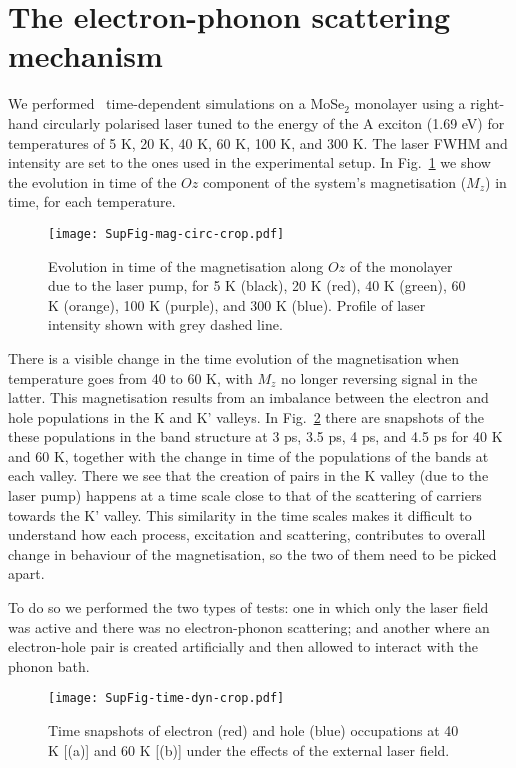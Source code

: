 \documentclass[prb,aps,superscriptaddress,reprint,floatfix]{revtex4-1}
\begin{document}
\section{The electron-phonon scattering mechanism}
\label{laser_elph}
We performed \ai  ~time-dependent simulations on a MoSe$_2$ monolayer using a right-hand circularly polarised laser tuned to the energy of the A exciton (1.69 eV) for temperatures of 5 K, 20 K, 40 K, 60 K, 100 K, and 300 K. The laser FWHM and intensity are set to the ones used in the experimental setup. In Fig.~\ref{fig:mag_time} we show the evolution in time of the $Oz$ component of the system's magnetisation ($M_z$) in time, for each temperature. 

\begin{figure}[ht]
	\texttt{[image: SupFig-mag-circ-crop.pdf]}
\caption{Evolution in time of the magnetisation along $Oz$ of the \mose monolayer due to the laser pump, for 5 K (black), 20 K (red), 40 K (green), 60 K (orange), 100 K (purple), and 300 K (blue). Profile of laser intensity shown with grey dashed line.}
\label{fig:mag_time}
\end{figure}

There is a visible change in the time evolution of the magnetisation when temperature goes from 40 to 60 K, with $M_z$ no longer reversing signal in the latter. This magnetisation results from an imbalance between the electron and hole populations in the K and K' valleys. In Fig.~\ref{fig:mag_time_1} there are snapshots of the these populations in the band structure at 3 ps, 3.5 ps, 4 ps, and 4.5 ps for 40 K and 60 K, together with the change in time of the populations of the bands at each valley. There we see that the creation of pairs in the K valley (due to the laser pump) happens at a time scale close to that of the scattering of carriers towards the K' valley. This similarity in the time scales makes it difficult to understand how each process, excitation and scattering, contributes to overall change in behaviour of the magnetisation, so the two of them need to be picked apart. 

To do so we performed the two types of tests: one in which only the laser field was active and there was no electron-phonon scattering; and another where an electron-hole pair is created artificially and then allowed to interact with the phonon bath. 

\begin{figure}[ht]
\texttt{[image: SupFig-time-dyn-crop.pdf]}
\caption{Time snapshots of electron (red) and hole (blue) occupations at 40 K [(a)] and 60 K [(b)] under the effects of the external laser field.}
\label{fig:mag_time_1}
\end{figure}
\end{document}
